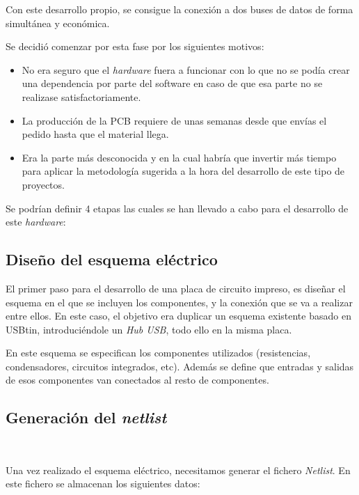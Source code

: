 Con este desarrollo propio, se consigue la conexión a dos buses de datos de forma simultánea y económica.

Se decidió comenzar por esta fase por los siguientes motivos:

\begin{itemize}
\item
No era seguro que el \emph{hardware} fuera a funcionar con lo que no se podía crear una dependencia por parte del software en caso de que esa parte no se realizase satisfactoriamente.

\item
La producción de la PCB requiere de unas semanas desde que envías el pedido hasta que el material llega.
\item
Era la parte más desconocida y en la cual habría que invertir más tiempo para aplicar la metodología sugerida a la hora del desarrollo de este tipo de proyectos.
\end{itemize}

Se podrían definir 4 etapas las cuales se han llevado a cabo para el desarrollo de este \emph{hardware}:

\subsection{Diseño del esquema eléctrico}\label{diseño_del_esquema_electrico}

El primer paso para el desarrollo de una placa de circuito impreso, es diseñar el esquema en el que se incluyen los componentes, y la conexión que se va a realizar entre ellos. En este caso, el objetivo era duplicar un esquema existente basado en USBtin\cite{usbtin}, introduciéndole un \emph{Hub USB}\cite{hubusb}, todo ello en la misma placa.


En este esquema se especifican los componentes utilizados (resistencias, condensadores, circuitos integrados, etc). Además se define que entradas y salidas de esos componentes van conectados al resto de componentes.


\subsection{Generación del \emph{netlist}}\

Una vez realizado el esquema eléctrico, necesitamos generar el fichero \emph{Netlist}. En este fichero se almacenan los siguientes datos:


